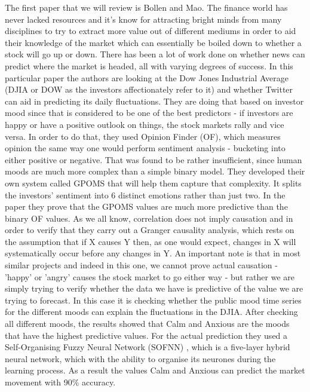 \documentclass[minf,twoside,singlespacing,parskip,frontabs,notimes,12pt]{infthesis} %
\begin{document}
The first paper that we will review is Bollen and Mao\cite{twitstock}. 
The finance world has never lacked resources and it's know for attracting bright minds from many disciplines to try to extract more value out of different mediums in order to aid their knowledge of the market which can essentially be boiled down to whether a stock will go up or down. 
There has been a lot of work done on whether news can predict where the market is headed, all with varying degrees of success. 
In this particular paper the authors are looking at the Dow Jones Industrial Average \cite{dija} (DJIA or DOW as the investors affectionately refer to it) and whether Twitter can aid in predicting its daily fluctuations. 
They are doing that based on investor mood since that is considered to be  one of the best predictors - if investors are happy or have a positive outlook on things, the stock markets rally and vice versa. 
In order to do that, they used Opinion Finder (OF)\cite{opfind}, which measures opinion the same way one would perform sentiment analysis - bucketing into either positive or negative. 
That was found to be rather insufficient, since human moods are much more complex than a simple binary model. 
They developed their own system called GPOMS that will help them capture that complexity. 
It splits the investors' sentiment into 6 distinct emotions rather than just two.
In the paper they prove that the GPOMS values are much more predictive than the binary OF values. 
As we all know, correlation does not imply causation and in order to verify that they carry out a Granger causality analysis\cite{granger}, which rests on the assumption that if X causes Y then, as one would expect, changes in X will systematically occur before any changes in Y. 
An important note is that in most similar projects and indeed in this one, we cannot prove actual causation - 'happy' or 'angry' causes the stock market to go either way - but rather we are simply trying to verify whether the data we have is predictive of the value we are trying to forecast. In this case it is checking whether the public mood time series for the different moods can explain the fluctuations in the DJIA. 
After checking all different moods, the results showed that Calm and Anxious are the moods that have the highest predictive values. 
For the actual prediction they used a Self-Organising Fuzzy Neural Network (SOFNN) \cite{sofnn}, which is a five-layer hybrid neural network, which with the ability to organise its neurones during the learning process. 
As a result the values Calm and Anxious can predict the market movement with 90\% accuracy. 
\end{document}
